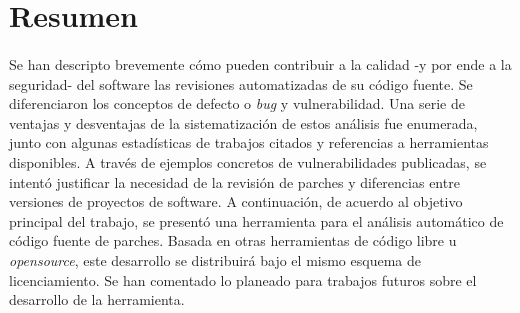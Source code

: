 \documentclass[11pt,a4paper]{article}
\begin{document}
\section{Resumen}

\paragraph{}Se han descripto brevemente cómo pueden contribuir a la calidad -y por ende a la seguridad- del software las revisiones automatizadas de su código fuente. Se diferenciaron los conceptos de defecto o \textit{bug} y vulnerabilidad. Una serie de ventajas y desventajas de la sistematización de estos análisis fue enumerada, junto con algunas estadísticas de trabajos citados y referencias a herramientas disponibles. A través de ejemplos concretos de vulnerabilidades publicadas, se intentó justificar la necesidad de la revisión de parches y diferencias entre versiones de proyectos de software. A continuación, de acuerdo al objetivo principal del trabajo, se presentó una herramienta para el análisis automático de código fuente de parches. Basada en otras herramientas de código libre u \textit{opensource}, este desarrollo se distribuirá bajo el mismo esquema de licenciamiento. Se han comentado lo planeado para trabajos futuros sobre el desarrollo de la herramienta.
\end{document}
